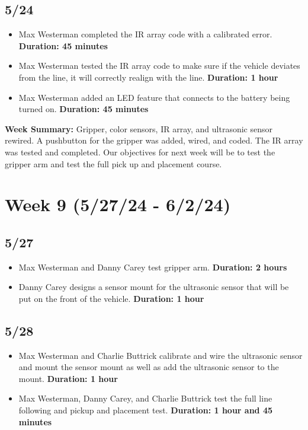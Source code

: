 \documentclass[11pt]{report}
\begin{document}
\subsection*{5/24}

\begin{itemize}
    \item Max Westerman completed the \gls{IR} array code with a calibrated error. \textbf{Duration: 45 minutes}
    \item Max Westerman tested the \gls{IR} array code to make sure if the vehicle deviates from the line, it will correctly realign with the line. \textbf{Duration: 1 hour}
    \item Max Westerman added an \gls{LED} feature that connects to the battery being turned on. \textbf{Duration: 45 minutes}
\end{itemize}

\textbf{Week Summary:} Gripper, color sensors, \gls{IR} array, and ultrasonic sensor rewired. A pushbutton for the gripper was added, wired, and coded. The \gls{IR} array was tested and completed. Our objectives for next week will be to test the gripper arm and test the full pick up and placement course.

\section{Week 9 (5/27/24 - 6/2/24)}
\subsection*{5/27}

\begin{itemize}
    \item Max Westerman and Danny Carey test gripper arm. \textbf{Duration: 2 hours}
    \item Danny Carey designs a sensor mount for the ultrasonic sensor that will be put on the front of the vehicle. \textbf{Duration: 1 hour}
\end{itemize}

\subsection*{5/28}

\begin{itemize}
    \item Max Westerman and Charlie Buttrick calibrate and wire the ultrasonic sensor and mount the sensor mount as well as add the ultrasonic sensor to the mount. \textbf{Duration: 1 hour}
    \item Max Westerman, Danny Carey, and Charlie Buttrick test the full line following and pickup and placement test. \textbf{Duration: 1 hour and 45 minutes}
\end{itemize}
\end{document}
